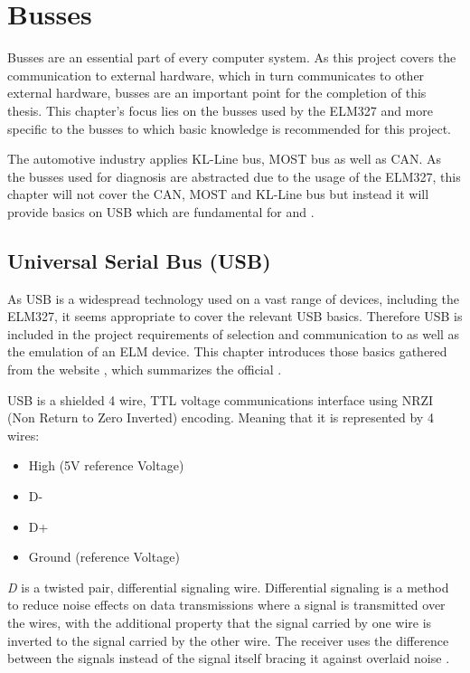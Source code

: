 \setcounter{section}{0}
\section{Busses}

Busses are an essential part of every computer system. As this project covers the communication to external hardware, which in turn communicates to other 
external hardware, busses are an important point for the completion of this thesis. This chapter’s focus lies on the busses used by the ELM327 and more 
specific to the busses to which basic knowledge is recommended for this project.

The automotive industry applies KL-Line bus, MOST bus as well as CAN. As the busses used for diagnosis are abstracted due to the usage of the ELM327, 
this chapter will not cover the CAN, MOST and KL-Line bus but instead it will provide basics on USB which are fundamental for  
and .

\subsection{Universal Serial Bus (USB)}
\label{sec:USB}
As USB is a widespread technology used on a vast range of devices, including the ELM327, it seems appropriate to cover the relevant USB basics.
Therefore USB is included in the project requirements of selection and communication to as well as the emulation of an ELM device. This chapter 
introduces those basics gathered from the website \cite{USBNUT}, which summarizes the official  
\cite[pp. 36ff., 199ff., 260-274]{USB}.


USB is a shielded 4 wire, TTL voltage communications interface using NRZI (Non Return to Zero Inverted) encoding. Meaning that it is represented by 4 wires:

\begin{itemize}
\item High (5V reference Voltage)
\item D-
\item D+
\item Ground (reference Voltage)
\end{itemize}

\emph{D} is a twisted pair, differential signaling wire. Differential signaling is a method to reduce noise effects on data transmissions where a signal
is transmitted over the wires, with the additional property that the signal carried by one wire is inverted to the signal carried by the other wire. The 
receiver uses the difference between the signals instead of the signal itself bracing it against overlaid noise \cite{Massoud2001}.

